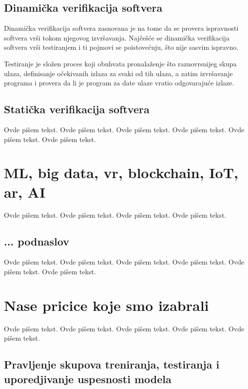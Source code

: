 \documentclass[a4paper]{article}
\begin{document}
{\subsection{Dinamička verifikacija softvera}
\label{subsec:dinamicka}

\par Dinamička verifikacija softvera zasnovana je na tome da se provera ispravnosti softvera vrši tokom njegovog izvršavanja. Najčešće se dinamička verifikacija softvera vrši testiranjem i ti pojmovi se poistovećuju, što nije sasvim ispravno.

\par Testiranje je složen proces koji obuhvata pronalaženje što raznovrsnijeg skupa ulaza, definisanje očekivanih izlaza za svaki od tih ulaza, a zatim izvršavanje programa i provera da li je program za date ulaze vratio odgovarajuće izlaze.

\subsection{Statička verifikacija softvera}
\label{subsec:staticka}

Ovde pišem tekst. 
Ovde pišem tekst. 
Ovde pišem tekst. 
Ovde pišem tekst. 
Ovde pišem tekst. 
Ovde pišem tekst. 

\section{ML, big data, vr, blockchain, IoT, ar, AI}
\label{sec:naslov2}

Ovde pišem tekst. 
Ovde pišem tekst. 
Ovde pišem tekst. 
Ovde pišem tekst. 

\subsection{... podnaslov}
\label{subsec:podnaslovN}

Ovde pišem tekst. 
Ovde pišem tekst. 
Ovde pišem tekst. 
Ovde pišem tekst. 
Ovde pišem tekst. 
Ovde pišem tekst. 

\section{Nase pricice koje smo izabrali}
\label{sec:naslovN}

Ovde pišem tekst. 
Ovde pišem tekst. 
Ovde pišem tekst. 
Ovde pišem tekst. 
Ovde pišem tekst. 

\subsection{Pravljenje skupova treniranja, testiranja i uporedjivanje uspesnosti modela}
\label{subsec:pregled}

}
\end{document}
